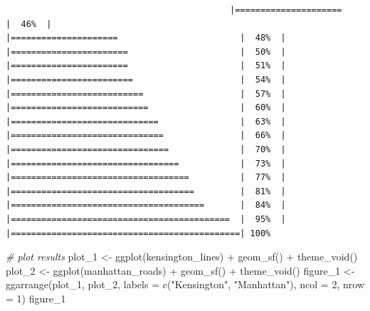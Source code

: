 \documentclass[
  krantz2]{krantz}
\makeatletter
\newenvironment{Shaded}{\begin{snugshade}}{\end{snugshade}}
\newcommand{\AttributeTok}[1]{\textcolor[rgb]{0.61,0.61,0.61}{#1}}
\newcommand{\CommentTok}[1]{\textcolor[rgb]{0.37,0.37,0.37}{\textit{#1}}}
\newcommand{\DecValTok}[1]{\textcolor[rgb]{0.06,0.06,0.06}{#1}}
\newcommand{\FunctionTok}[1]{\textcolor[rgb]{0,0,0}{#1}}
\newcommand{\NormalTok}[1]{#1}
\newcommand{\OtherTok}[1]{\textcolor[rgb]{0.37,0.37,0.37}{#1}}
\newcommand{\SpecialCharTok}[1]{\textcolor[rgb]{0,0,0}{#1}}
\newcommand{\StringTok}[1]{\textcolor[rgb]{0.5,0.5,0.5}{#1}}
\newenvironment{kframe}{%
\medskip{}
\setlength{\fboxsep}{.8em}
 \def\at@end@of@kframe{}%
 \ifinner\ifhmode%
  \def\at@end@of@kframe{\end{minipage}}%
  \begin{minipage}{\columnwidth}%
 \fi\fi%
 \def\FrameCommand##1{\hskip\@totalleftmargin \hskip-\fboxsep
 \colorbox{shadecolor}{##1}\hskip-\fboxsep
     \hskip-\linewidth \hskip-\@totalleftmargin \hskip\columnwidth}%
 \MakeFramed {\advance\hsize-\width
   \@totalleftmargin\z@ \linewidth\hsize
   \@setminipage}}%
 {\par\unskip\endMakeFramed%
 \at@end@of@kframe}
\renewenvironment{Shaded}{\begin{kframe}}{\end{kframe}}
\makeatother
\begin{document}
\begin{verbatim}
                                            |=====================                        |  46%  |                                                     |=====================                        |  48%  |                                                     |=======================                      |  50%  |                                                     |=======================                      |  51%  |                                                     |========================                     |  54%  |                                                     |==========================                   |  57%  |                                                     |===========================                  |  60%  |                                                     |=============================                |  63%  |                                                     |==============================               |  66%  |                                                     |===============================              |  70%  |                                                     |=================================            |  73%  |                                                     |===================================          |  77%  |                                                     |====================================         |  81%  |                                                     |======================================       |  84%  |                                                     |===========================================  |  95%  |                                                     |=============================================| 100%
\end{verbatim}

\begin{Shaded}
\begin{Highlighting}[]
\CommentTok{\# plot results }
\NormalTok{plot\_1 }\OtherTok{\textless{}{-}} \FunctionTok{ggplot}\NormalTok{(kensington\_lines) }\SpecialCharTok{+} \FunctionTok{geom\_sf}\NormalTok{() }\SpecialCharTok{+} \FunctionTok{theme\_void}\NormalTok{()}
\NormalTok{plot\_2 }\OtherTok{\textless{}{-}} \FunctionTok{ggplot}\NormalTok{(manhattan\_roads) }\SpecialCharTok{+} \FunctionTok{geom\_sf}\NormalTok{() }\SpecialCharTok{+} \FunctionTok{theme\_void}\NormalTok{()}
\NormalTok{figure\_1 }\OtherTok{\textless{}{-}} \FunctionTok{ggarrange}\NormalTok{(plot\_1, plot\_2, }\AttributeTok{labels =} \FunctionTok{c}\NormalTok{(}\StringTok{"Kensington"}\NormalTok{, }\StringTok{"Manhattan"}\NormalTok{),}
                    \AttributeTok{ncol =} \DecValTok{2}\NormalTok{, }\AttributeTok{nrow =} \DecValTok{1}\NormalTok{)}
\NormalTok{figure\_1}
\end{Highlighting}
\end{Shaded}
\end{document}
